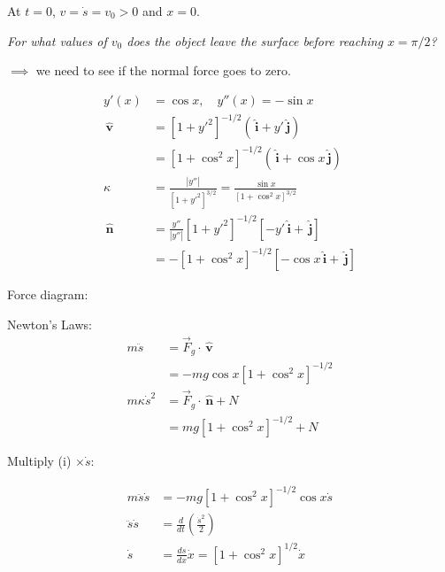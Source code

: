 \documentclass[twoside]{scrartcl}
\let\oldhat\hat
\renewcommand{\hat}[1]{\,\oldhat{\boldsymbol{\mathbf{#1}}}}
\begin{document}
\begin{example}
At $t = 0$, $v = \dot{s} = v_0 > 0$ and $x = 0$. 

\emph{For what values of $v_0$ does the object leave the surface before reaching $x = \pi/2$?}

$\implies$ we need to see if the normal force goes to zero. 

\[
\begin{aligned}
  y'(x) &= \cos x, \quad y''(x) = -\sin x\\[0.2cm]
  \hat{v} &= [1+y'^2]^{-1/2}(\hat{i} + y'\hat{j})\\
  &= [1+\cos^2x]^{-1/2}(\hat{i} + \cos x\hat{j})\\[0.2cm]
  \kappa &= \frac{|y''|}{[1+y'^2]^{3/2}} = \frac{\sin x}{[1 + \cos^2x]^{3/2}}\\[0.2cm]
  \hat{n} &= \frac{y''}{|y''|}[1 + y'^2]^{-1/2}[-y'\hat{i} + \hat{j}]\\
  &= -[1+\cos^2x]^{-1/2}[-\cos x \hat{i} + \hat{j}]
\end{aligned}
\]

Force diagram: 
\begin{center}
\end{center}


Newton's Laws: 
\begin{align*}
  m\ddot{s} &= \vec{F}_g \cdot\hat{v}\\
  &= -mg\cos x [1+\cos^2x]^{-1/2} \tag{i}\\
  m\kappa \dot{s}^2 &= \vec{F}_g\cdot\hat{n} + N\\
  &= mg[1 + \cos^2x]^{-1/2} + N \tag{ii}
\end{align*}

Multiply (i) $\times \dot{s}$:

\[
\begin{aligned}
  m\ddot{s}\dot{s} &= -mg[1+\cos^2x]^{-1/2}\cos x \dot{s}\\
  \ddot{s}\dot{s} &= \frac{d}{dt}\left(\frac{\dot{s}^2}{2}\right)\\
  \dot{s} &= \frac{ds}{dx}\dot{x} = [1 + \cos^2x]^{1/2}\dot{x}
\end{aligned}
\]


\end{example}
\end{document}
